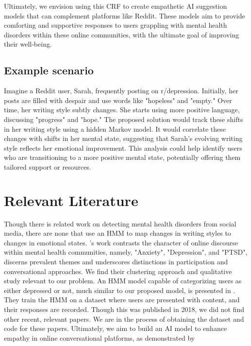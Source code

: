 \documentclass[conference,compsoc]{IEEEtran}
\begin{document}
Ultimately, we envision using this CRF to create empathetic AI suggestion models that can complement platforms like Reddit. These models aim to provide comforting and supportive responses to users grappling with mental health disorders within these online communities, with the ultimate goal of improving their well-being.

\subsection{Example scenario}
Imagine a Reddit user, Sarah, frequently posting on r/depression. Initially, her posts are filled with despair and use words like "hopeless" and "empty." Over time, her writing style subtly changes. She starts using more positive language, discussing "progress" and "hope." The proposed solution would track these shifts in her writing style using a hidden Markov model. It would correlate these changes with shifts in her mental state, suggesting that Sarah's evolving writing style reflects her emotional improvement. This analysis could help identify users who are transitioning to a more positive mental state, potentially offering them tailored support or resources.

\section{Relevant Literature}
Though there is related work on detecting mental health disorders from social media, there are none that use an HMM to map changes in writing styles to changes in emotional states. \citet{Park+18:mental-health-reddit}'s work contrasts the character of online discourse within mental health communities, namely, "Anxiety", "Depression", and "PTSD", discerns prevalent themes and underscores distinctions in participation and conversational approaches. We find their clustering approach and qualitative study relevant to our problem. An HMM model capable of categorizing users as either depressed or not, much similar to our proposed model, is presented in \citep{Ansari+18:dcr-hmm}. They train the HMM on a dataset where users are presented with content, and their responses are recorded. Though this was published in 2018, we did not find other recent, relevant papers. We are in the process of obtaining the dataset and code for these papers. Ultimately, we aim to build an AI model to enhance empathy in online conversational platforms, as demonstrated by \citet{Sharma+23:human-ai-empathic-conversation}
\end{document}

